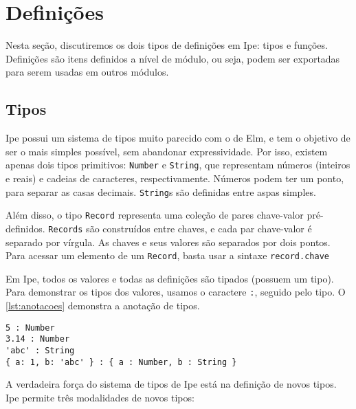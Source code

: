 \section{Definições}\label{sec:definicoes}

Nesta seção, discutiremos os dois tipos de definições em Ipe: tipos e funções.
Definições são itens definidos a nível de módulo, ou seja, podem ser exportadas
para serem usadas em outros módulos.

\subsection{Tipos}\label{sec:tipos}

Ipe possui um sistema de tipos muito parecido com o de Elm, e tem o objetivo de
ser o mais simples possível, sem abandonar expressividade. Por isso, existem
apenas dois tipos primitivos: \texttt{Number} e \texttt{String}, que representam
números (inteiros e reais) e cadeias de caracteres, respectivamente. Números podem
ter um ponto, para separar as casas decimais. \texttt{String}s são definidas entre
aspas simples.

Além disso, o tipo \texttt{Record} representa uma coleção de pares chave-valor
pré-definidos. \texttt{Records} são construídos entre chaves, e cada par chave-valor
é separado por vírgula. As chaves e seus valores são separados por dois pontos.
Para acessar um elemento de um \texttt{Record}, basta usar a sintaxe \texttt{record.chave}


Em Ipe, todos os valores e todas as definições são tipados (possuem um tipo). Para
demonstrar os tipos dos valores, usamos o caractere \texttt{:}, seguido pelo tipo.
O \autoref{lst:anotacoes} demonstra a anotação de tipos.

\begin{lstlisting}[label={lst:anotacoes},caption={Exemplo de anotação de tipos}]
5 : Number
3.14 : Number
'abc' : String
{ a: 1, b: 'abc' } : { a : Number, b : String }
\end{lstlisting}

A verdadeira força do sistema de tipos de Ipe está na definição de novos tipos.
Ipe permite três modalidades de novos tipos:

